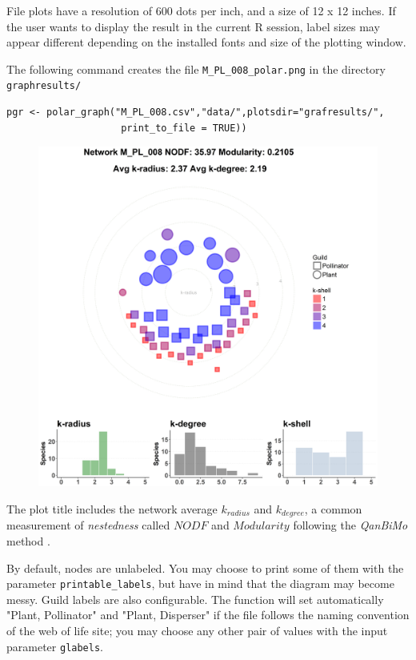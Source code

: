 \documentclass[11pt]{article}
\begin{document}
File plots have a resolution of 600 dots per inch, and a size of 12 x 12 inches. If the user wants to display the result in the current R session, label sizes may appear different depending on the installed fonts and size of the plotting window.

The following command creates the file \texttt{M\_PL\_008\_polar.png} in the directory \texttt{graphresults/}

\fontsize{3.5mm}{3.5mm}\selectfont
\begin{verbatim}
pgr <- polar_graph("M_PL_008.csv","data/",plotsdir="grafresults/",
                    print_to_file = TRUE))
\end{verbatim}
\normalsize

\begin{figure}[h!]
\centering
\includegraphics[scale=0.4]{M_PL_008_polar.png}
\label{fig:M_PL_034_polar}
\end{figure}

The plot title includes the network average ${k}_{radius}$ and ${k}_{degree}$, a common measurement of \textit{nestedness} called $NODF$ \cite{almeida2008consistent} and $Modularity$ following the \textit{QanBiMo} method \cite{dormann2014method}.

By default, nodes are unlabeled. You may choose to print some of them with the parameter \texttt{printable\_labels}, but have in mind that the
diagram may become messy. Guild labels are also configurable. The function will set automatically "Plant, Pollinator" and "Plant, Disperser" if the
file follows the naming convention of the web of life site; you may choose any other pair of values with the input parameter \texttt{glabels}.
\end{document}
